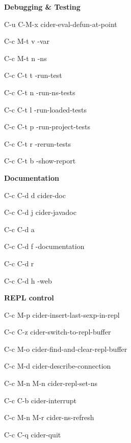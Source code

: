 \documentclass[a4paper,10pt]{article}
\renewcommand\section[1]{\bigskip\par\textbf{\large#1}\medskip}
\newcommand\keyify[1]{\keys{\ttfamily#1}}
\begin{document}
\begin{multicols}{2}
\columnbreak

\section{Debugging \& Testing}
\begin{keylist}[labelwidth=\widthof{\keyify{C-c C-d C-a}}]
\item[C-u C-M-x] cider-eval-defun-at-point
\item[C-c M-t v] -var
\item[C-c M-t n] \ns                    -ns
\item[C-c C-t t] -run-test
\item[C-c C-t n] \ns            -run-ns-tests
\item[C-c C-t l] \ns            -run-loaded-tests
\item[C-c C-t p] \ns            -run-project-tests
\item[C-c C-t r] \ns            -rerun-tests
\item[C-c C-t b] \ns            -show-report
\end{keylist}

\section{Documentation}
\begin{keylist}[labelwidth=\widthof{\keyify{C-c C-d C-a}}]
  \item[C-c C-d d] cider-doc
  \item[C-c C-d j] cider-javadoc
  \item[C-c C-d a] 
  \item[C-c C-d f] \ns               -documentation
  \item[C-c C-d r] 
  \item[C-c C-d h] \ns                -web
\end{keylist}

\section{REPL control}
\begin{keylist}[labelwidth=\widthof{\keyify{C-c M-c}}]
  \item[C-c M-p] cider-insert-last-sexp-in-repl
  \item[C-c C-z] cider-switch-to-repl-buffer
  \item[C-c M-o] cider-find-and-clear-repl-buffer
  \item[C-c M-d] cider-describe-connection
  \item[C-c M-n M-n] cider-repl-set-ns
  \item[C-c C-b] cider-interrupt
  \item[C-c M-n M-r] cider-ns-refresh
  \item[C-c C-q] cider-quit
\end{keylist}
\end{multicols}
\end{document}
